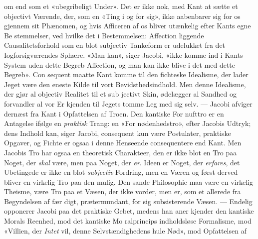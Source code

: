 \documentclass[12pt,a4paper]{book}
\begin{document}
om end som et «ubegribeligt Under». Det er ikke nok, med
Kant at sætte et objectivt Værende, der, som en «Ting i og
for sig», ikke aabenbarer sig for os gjennem sit Phænomen, og
hvis Afficeren af os bliver utænkelig efter Kants egne Be\-%
stemmelser, ved hvilke det i Bestemmelsen: Affection liggende
Causalitetsforhold som en blot subjectiv Tankeform er udelukket
fra det Iogforsigværendes Sphære. «Man kan», siger Jacobi,
«ikke komme ind i Kants System uden dette Begreb Affection,
og man kan ikke blive i det med dette Begreb». Con\-%
sequent maatte Kant komme til den fichteske Idealisme, der
lader Jeget være den eneste Kilde til vort Bevidsthedsindhold.
Men denne Idealisme, der gjør al objectiv Realitet til et sub\-%
jectivt Skin, ødelægger al Sandhed og forvandler al vor Er\-%
kjenden til Jegets tomme Leg med sig selv. --- Jacobi afviger
dernæst fra Kant i Opfattelsen af Troen. Den kantiske For\-%
nufttro er en Antagelse ifølge en \emph{praktisk} Trang: en «For\-%
nødenhedstro», efter Jacobis Udtryk; dens Indhold kan, siger
Jacobi, consequent kun være Postulater, praktiske Opgaver, og
Fichte er ogsaa i denne Henseende consequentere end Kant.
Men Jacobis Tro har ogsaa en theoretisk Charakteer, den er
ikke blot en Tro paa Noget, der \emph{skal} være, men paa Noget,
der \emph{er}. Ideen er Noget, der \emph{erfares}, det Ubetingede er ikke
en blot \emph{subjectiv} Fordring, men en Væren og først derved
bliver en virkelig Tro paa den mulig. Den sande Philosophie
maa være en virkelig Theisme, være Tro paa et Væsen, der
ikke vorder, men er, som et allerede fra Begyndelsen af fær\-%
digt, prætermundant, for sig subsisterende Væsen. --- Endelig
opponerer Jacobi paa det praktiske Gebet, medens han aner\-%
kjender den kantiske Morals Reenhed, mod det kantiske Mo\-%
ralprincips indholdsløse Formalisme, mod «Villien, der \emph{Intet}
vil, denne Selvstændighedens hule Nød», mod Opfattelsen af
\end{document}
